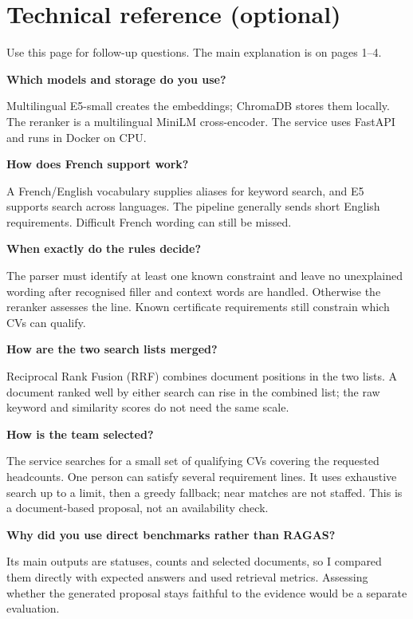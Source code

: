 \documentclass[11pt,a4paper]{article}
\newcommand{\qa}[2]{\needspace{5\baselineskip}\textbf{\color{navy}#1}\par\nopagebreak
  #2\par\vspace{6pt}}
\newcommand{\smallref}[1]{{\footnotesize\color{muted}#1}}
\begin{document}
\newpage
\section*{Technical reference \textnormal{\large(optional)}}
\smallref{Use this page for follow-up questions. The main explanation is on pages 1--4.}
\vspace{7pt}

\qa{Which models and storage do you use?}{Multilingual E5-small creates the embeddings; ChromaDB stores them locally. The reranker is a multilingual MiniLM cross-encoder. The service uses FastAPI and runs in Docker on CPU.}

\qa{How does French support work?}{A French/English vocabulary supplies aliases for keyword search, and E5 supports search across languages. The pipeline generally sends short English requirements. Difficult French wording can still be missed.}

\qa{When exactly do the rules decide?}{The parser must identify at least one known constraint and leave no unexplained wording after recognised filler and context words are handled. Otherwise the reranker assesses the line. Known certificate requirements still constrain which CVs can qualify.}

\qa{How are the two search lists merged?}{Reciprocal Rank Fusion (RRF) combines document positions in the two lists. A document ranked well by either search can rise in the combined list; the raw keyword and similarity scores do not need the same scale.}

\qa{How is the team selected?}{The service searches for a small set of qualifying CVs covering the requested headcounts. One person can satisfy several requirement lines. It uses exhaustive search up to a limit, then a greedy fallback; near matches are not staffed. This is a document-based proposal, not an availability check.}

\qa{Why did you use direct benchmarks rather than RAGAS?}{Its main outputs are statuses, counts and selected documents, so I compared them directly with expected answers and used retrieval metrics. Assessing whether the generated proposal stays faithful to the evidence would be a separate evaluation.}
\end{document}

